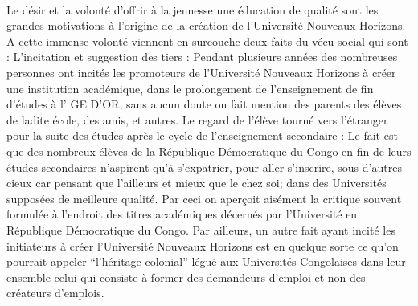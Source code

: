 \paragraph{}
Le désir et la volonté d’offrir à la jeunesse une éducation de qualité sont les grandes motivations à l'origine de la création de l'Université Nouveaux Horizons. A cette immense volonté viennent en surcouche deux faits du vécu social qui sont : 
L'incitation et suggestion des tiers : 
Pendant plusieurs années des nombreuses personnes ont incités les promoteurs de l’Université Nouveaux Horizons à  créer une institution académique, dans le prolongement de l’enseignement de fin d’études  à l' GE D’OR, sans aucun doute on fait mention des parents des élèves de ladite école, des amis, et autres. 
Le regard de l’élève tourné vers l’étranger pour la suite des études après le cycle de l’enseignement secondaire : 
Le fait est que des nombreux élèves de la République Démocratique du Congo en fin de leurs études secondaires n’aspirent qu'à s'expatrier, pour aller s'inscrire, sous d’autres cieux car pensant que l’ailleurs et mieux que le chez soi; dans des Universités supposées de meilleure qualité. Par ceci on aperçoit aisément la critique souvent formulée à l’endroit des titres académiques décernés par l'Université en République Démocratique du Congo.
Par ailleurs, un autre fait ayant incité les initiateurs à créer l'Université Nouveaux Horizons est en quelque sorte ce qu’on pourrait appeler “l'héritage colonial” légué aux Universités Congolaises dans leur ensemble celui qui consiste à former des demandeurs d’emploi et non des créateurs d’emplois.

